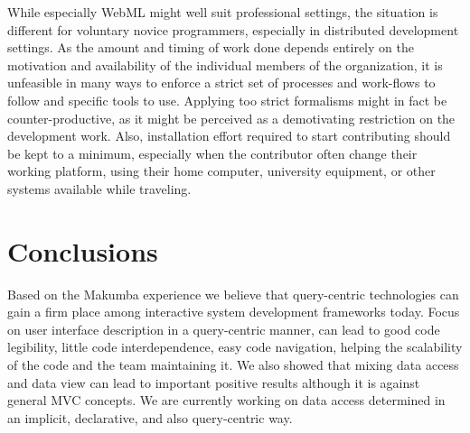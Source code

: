 \documentclass{chi2009}
\begin{document}
While especially WebML might well suit professional settings, the situation is different for voluntary novice programmers, especially in distributed development settings. As the amount and timing of work done depends entirely on the motivation and availability of the individual members of the organization, it is unfeasible in many ways to enforce a strict set of processes and work-flows to follow and specific tools to use. Applying too strict formalisms might in fact be counter-productive, as it might be perceived as a demotivating restriction on the development work. Also, installation effort required to start contributing should be kept to a minimum, especially when the contributor often change their working platform, using their home computer, university equipment, or other systems available while traveling.




\section{Conclusions}\label{sec:conclusions}
Based on the Makumba experience we believe that query-centric technologies can gain a firm place among interactive system development frameworks today. Focus on  user interface description in a query-centric manner, can lead to good  code legibility, little code interdependence, easy code navigation,  helping the scalability of the code and the team maintaining it.  We also showed that mixing data access and data view can lead to important positive results although it is against general MVC concepts. We are currently working on data access determined in an implicit, declarative, and also query-centric way. 
\end{document}
